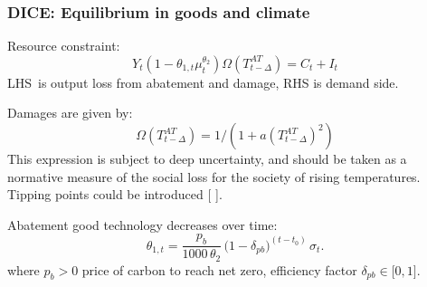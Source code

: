 \documentclass[xcolor=x11names,compress,aspectratio=169]{beamer}%
\makeatletter
\renewenvironment{itemize}{\begin{compactitemize}[<+-| alert@+>]}{\end{compactitemize}}
\makeatother
\begin{document}
\begin{frame}%
%

\frametitle{DICE: Equilibrium in goods and climate}%


\begin{itemize}
\item Resource constraint:
\begin{equation}
Y_{t}\left(  1-\theta_{1,t}\mu_{t}^{\theta_{2}}\right)  \Omega\left(
T_{t-\Delta}^{AT}\right)  =C_{t}+I_{t}%
\end{equation}
LHS\ is output loss from abatement and damage, RHS is demand
side{\normalsize .}%
\vspace{1ex}%


\item Damages are given by:%
\begin{equation}
\Omega\left(  T_{t-\Delta}^{AT}\right)  =1/(1+a\left(  T_{t-\Delta}%
^{AT}\right)  ^{2})
\end{equation}
This expression is subject to deep uncertainty, and should be taken as a
normative measure of the social loss for the society of rising temperatures.
Tipping points could be introduced [%
\citealp{weitzman2012ghg}%
].%
\vspace{1ex}%


\item Abatement good technology decreases over time:%
\begin{equation}
\theta_{1,t}=\frac{p_{b}}{1000\,\theta_{2}}\,\big(1-\delta_{pb}\big)^{\left(
t-t_{0}\right)  }\,\sigma_{t}.
\end{equation}
where $p_{b}>0$ price of carbon to reach net zero, efficiency factor
$\delta_{pb}\in\lbrack0,1]$.
\end{itemize}

%

\transboxout
\end{frame}%
%
\end{document}
